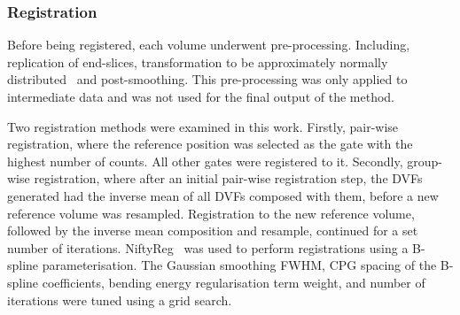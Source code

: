             \subsubsection{Registration} \label{sec:comparison_of_motion_correction_methods_incorporating_motion_modelling_for_pet_ct_using_a_single_breath_hold_attenuation_map_registration}
                Before being registered, each volume underwent pre-processing. Including, replication of end-slices, transformation to be approximately normally distributed~\parencite{Johnson2013} and post-smoothing. This pre-processing was only applied to intermediate data and was not used for the final output of the method.%
                
                Two registration methods were examined in this work. Firstly, pair-wise registration, where the reference position was selected as the gate with the highest number of counts. All other gates were registered to it. Secondly, group-wise registration, where after an initial pair-wise registration step, the \glspl{DVF} generated had the inverse mean of all \glspl{DVF} composed with them, before a new reference volume was resampled. Registration to the new reference volume, followed by the inverse mean composition and resample, continued for a set number of iterations. NiftyReg~\parencite{Modat2010} was used to perform registrations using a B-spline parameterisation. The Gaussian smoothing \gls{FWHM}, \gls{CPG} spacing of the B-spline coefficients, bending energy regularisation term weight, and number of iterations were tuned using a grid search.
            
